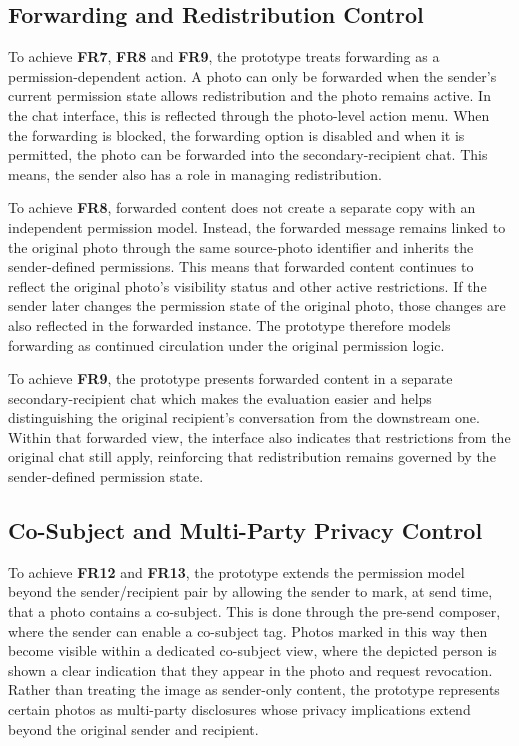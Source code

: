 \subsection{Forwarding and Redistribution Control}
To achieve \textbf{FR7}, \textbf{FR8} and \textbf{FR9}, the prototype treats forwarding as a permission-dependent action. A photo can only be forwarded when the sender's current permission state allows redistribution and the photo remains active. In the chat interface, this is reflected through the photo-level action menu. When the forwarding is blocked, the forwarding option is disabled and when it is permitted, the photo can be forwarded into the secondary-recipient chat. This means, the sender also has a role in managing redistribution.

To achieve \textbf{FR8}, forwarded content does not create a separate copy with an independent permission model. Instead, the forwarded message remains linked to the original photo through the same source-photo identifier and inherits the sender-defined permissions. This means that forwarded content continues to reflect the original photo's visibility status and other active restrictions. If the sender later changes the permission state of the original photo, those changes are also reflected in the forwarded instance. The prototype therefore models forwarding as continued circulation under the original permission logic.

To achieve \textbf{FR9}, the prototype presents forwarded content in a separate secondary-recipient chat which makes the evaluation easier and helps distinguishing the original recipient's conversation from the downstream one. Within that forwarded view, the interface also indicates that restrictions from the original chat still apply, reinforcing that redistribution remains governed by the sender-defined permission state. 

\subsection{Co-Subject and Multi-Party Privacy Control}
To achieve \textbf{FR12} and \textbf{FR13}, the prototype extends the permission model beyond the sender/recipient pair by allowing the sender to mark, at send time, that a photo contains a co-subject. This is done through the pre-send composer, where the sender can enable a co-subject tag. Photos marked in this way then become visible within a dedicated co-subject view, where the depicted person is shown a clear indication that they appear in the photo and request revocation. Rather than treating the image as sender-only content, the prototype represents certain photos as multi-party disclosures whose privacy implications extend beyond the original sender and recipient.

